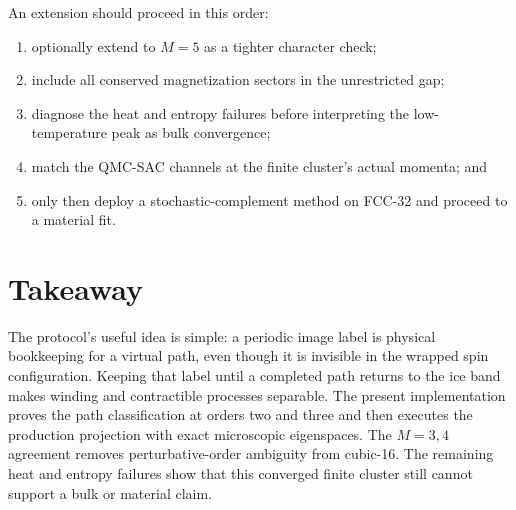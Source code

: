 \documentclass[11pt]{article}
\begin{document}
An extension should proceed in this order:
\begin{enumerate}
 \item optionally extend to $M=5$ as a tighter character check;
 \item include all conserved magnetization sectors in the unrestricted gap;
 \item diagnose the heat and entropy failures before interpreting the low-temperature
 peak as bulk convergence;
 \item match the QMC-SAC channels at the finite cluster's actual momenta; and
 \item only then deploy a stochastic-complement method on FCC-32 and proceed
 to a material fit.
\end{enumerate}

\section{Takeaway}

The protocol's useful idea is simple: a periodic image label is physical
bookkeeping for a virtual path, even though it is invisible in the wrapped
spin configuration.  Keeping that label until a completed path returns to the
ice band makes winding and contractible processes separable.  The present
implementation proves the path classification at orders two and three and
then executes the production projection with exact microscopic eigenspaces.
The $M=3,4$ agreement removes perturbative-order ambiguity from cubic-16.  The
remaining heat and entropy failures show that this converged finite cluster
still cannot support a bulk or material claim.



\end{document}

